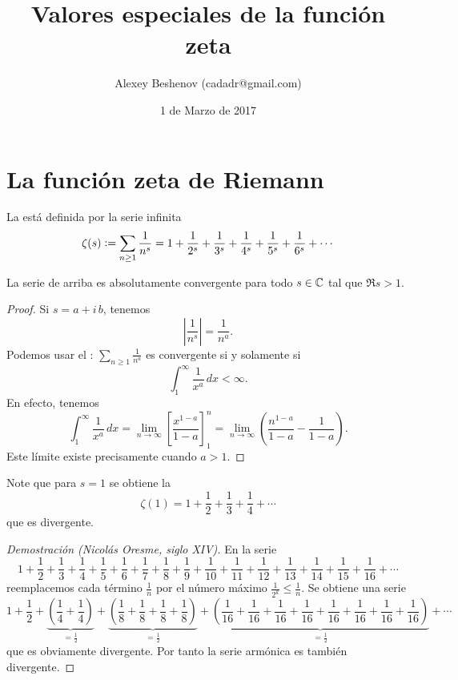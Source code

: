 \documentclass{article}
\author{Alexey Beshenov (cadadr@gmail.com)}
\title{Valores especiales de la función zeta}
\date{1 de Marzo de 2017}
\begin{document}
{\normalfont\sffamily\bfseries \maketitle}

\section*{La función zeta de Riemann}

\begin{definicion*}
La  está definida por la serie infinita
$$\zeta (s) \mathrel{\mathop:}= \sum_{n \ge 1} \frac{1}{n^s} = 1 + \frac{1}{2^s} + \frac{1}{3^s} + \frac{1}{4^s} + \frac{1}{5^s} + \frac{1}{6^s} + \cdots$$
\end{definicion*}

\begin{observacion*}
La serie de arriba es absolutamente convergente para todo $s \in \mathbb{C}$ tal que $\Re s > 1$.

\begin{proof}
Si $s = a + i\,b$, tenemos
$$\left|\frac{1}{n^s}\right| = \frac{1}{n^a}.$$
Podemos usar el : $\sum_{n \ge 1} \frac{1}{n^a}$ es convergente si y solamente si
$$\int_1^\infty \frac{1}{x^a}\,dx < \infty.$$
En efecto, tenemos
$$\int_1^\infty \frac{1}{x^a}\,dx = \lim_{n \to \infty} \left[\frac{x^{1-a}}{1-a}\right]^n_1 = \lim_{n \to \infty} \left(\frac{n^{1-a}}{1-a} - \frac{1}{1-a}\right).$$
Este límite existe precisamente cuando $a > 1$.
\end{proof}
\end{observacion*}

Note que para $s = 1$ se obtiene la 
$$\zeta (1) = 1 + \frac{1}{2} + \frac{1}{3} + \frac{1}{4} + \cdots$$
que es divergente.

\begin{proof}[Demostración (Nicolás Oresme, siglo XIV)]
En la serie
$$1 + \frac{1}{2} + \frac{1}{3} + \frac{1}{4} + \frac{1}{5} + \frac{1}{6} + \frac{1}{7} + \frac{1}{8} + \frac{1}{9} + \frac{1}{10} + \frac{1}{11} + \frac{1}{12} + \frac{1}{13} + \frac{1}{14} + \frac{1}{15} + \frac{1}{16} + \cdots$$
reemplacemos cada término $\frac{1}{n}$ por el número máximo $\frac{1}{2^k} \le \frac{1}{n}$. Se obtiene una serie
$$1 + \frac{1}{2} + \underbrace{\left(\frac{1}{4} + \frac{1}{4}\right)}_{= \frac{1}{2}} + \underbrace{\left(\frac{1}{8} + \frac{1}{8} + \frac{1}{8} + \frac{1}{8}\right)}_{= \frac{1}{2}} + \underbrace{\left(\frac{1}{16} + \frac{1}{16} + \frac{1}{16} + \frac{1}{16} + \frac{1}{16} + \frac{1}{16} + \frac{1}{16} + \frac{1}{16}\right)}_{= \frac{1}{2}} + \cdots$$
que es obviamente divergente. Por tanto la serie armónica es también divergente.
\end{proof}
\end{document}
